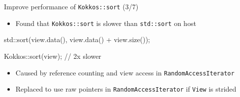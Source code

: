 \begin{frame}[fragile]{Improve performance of \texttt{Kokkos::sort} (3/7)}

\begin{itemize}
\item Found that \texttt{Kokkos::sort} is slower than \texttt{std::sort} on host
\end{itemize}

\vspace{5pt}

\begin{code}
  std::sort(view.data(), view.data() + view.size());

  Kokkos::sort(view); // 2x slower
\end{code}

\vspace{5pt}

\begin{itemize}
  \item Caused by reference counting and view access in \texttt{RandomAccessIterator}
  \item Replaced to use raw pointers in \texttt{RandomAccessIterator} if \texttt{View} is strided
\end{itemize}




\end{frame}


